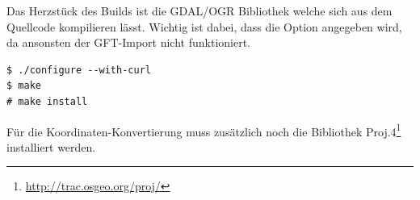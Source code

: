 Das Herzstück des Builds ist die GDAL/OGR Bibliothek welche sich aus dem Quellcode kompilieren lässt. Wichtig ist dabei, dass die Option  angegeben wird, da ansonsten der GFT-Import nicht funktioniert.

\lstset{language=bash}
\begin{lstlisting}[caption=Kompilierung der GDAL/OGR Bibliothek mit cURL, label=converter-build-example]
$ ./configure --with-curl
$ make
# make install
\end{lstlisting}

Für die Koordinaten-Konvertierung muss zusätzlich noch die Bibliothek Proj.4\footnote{\url{http://trac.osgeo.org/proj/}} installiert werden.
